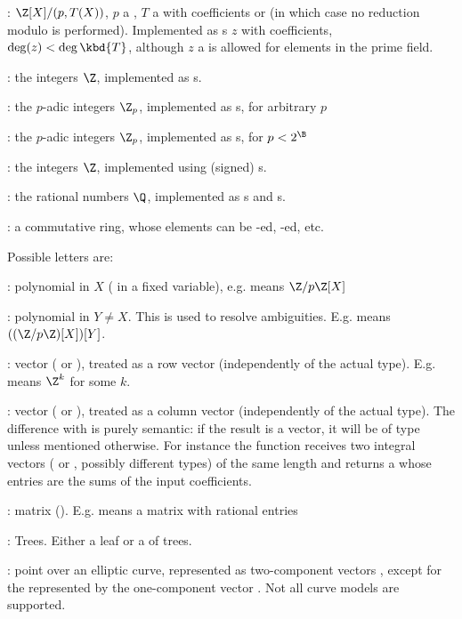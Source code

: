   : $\Z[X]/(p,T(X))$, $p$ a , $T$ a  with 
coefficients or  (in which case no reduction modulo  is
performed). Implemented as s $z$ with  coefficients,
$\deg(z) < \deg \kbd{T}$, although $z$ a  is allowed for elements in
the prime field.

  :  the integers $\Z$, implemented as s.

  : the $p$-adic integers $\Z_p$, implemented as s, for arbitrary $p$

  : the $p$-adic integers $\Z_p$, implemented as s, for $p< 2^{\B}$

  :  the integers $\Z$, implemented using (signed) s.

  :  the rational numbers $\Q$, implemented as s and
s.

  :  a commutative ring, whose elements can be
-ed, -ed, etc.

\noindent Possible letters are:

  : polynomial in $X$ ( in a fixed variable), e.g. 
           means $\Z/p\Z[X]$

  : polynomial in $Y\neq X$. This is used to resolve ambiguities.
           E.g.  means $((\Z/p\Z)[X])[Y]$.

  : vector ( or ), treated as a row vector
  (independently of the actual type). E.g.  means $\Z^k$ for some $k$.

  : vector ( or ), treated as a column vector
  (independently of the actual type). The difference with  is purely
  semantic: if the result is a vector, it will be of type  unless
  mentioned otherwise. For instance the function  receives two
  integral vectors ( or , possibly different types) of the
  same length and returns a  whose entries are the sums of the input
  coefficients.

  : matrix (). E.g.  means a matrix with rational
  entries

  : Trees. Either a leaf or a  of trees.

  : point over an elliptic curve, represented
  as two-component vectors \kbd{[x,y]}, except for the  represented by the
  one-component vector \kbd{[0]}. Not all curve models are supported.

